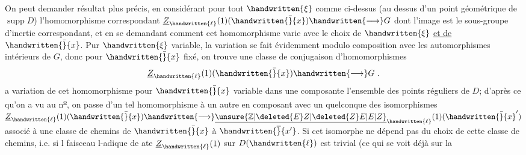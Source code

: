  On peut demander  résultat plus précis, en  considérant pour tout $\handwritten{\xi}$ comme ci-dessus (au dessus d'un point géométrique de $\operatorname{supp}D$) l'homomorphisme correspondant $\underline{Z}_{\handwritten{\ell}}(1)(\handwritten{\bar}{x})\handwritten{\longrightarrow}G$ dont l'image est le sous-groupe d'inertie correspondant, et en se demandant comment cet homomorphisme varie avec le choix de $\handwritten{\xi}$ \uline{et de} $\handwritten{\bar}{x}$. Pur $\handwritten{\xi}$ variable, la variation se fait évidemment modulo composition avec les automorphismes intérieurs de $G$,  donc pour $\handwritten{\bar}{x}$ fixé, on trouve une classe de conjugaison d'homomorphismes
\[
\underline{Z}_{\handwritten{\ell}}(1)(\handwritten{\bar}{x})\handwritten{\longrightarrow}G\ .
\]
 a variation de cet homomorphisme\handwritten{,} pour $\handwritten{\bar}{x}$ variable dans une composante  l'ensemble des points réguliers de $D$; d'après ce qu'on a vu au n\textsuperscript{\uline{o}}, on passe d'un tel homomorphisme à un autre en composant avec un quelconque des isomorphismes $\underline{Z}_{\handwritten{\ell}}(1)(\handwritten{\bar}{x})\handwritten{\longrightarrow}\underline{\unsure{\mathbb{Z}|\deleted{E}Z|\deleted{Z}E|E|Z}}_{\handwritten{\ell}}(1)(\handwritten{\bar}{x}')$ associé à une classe de chemins de $\handwritten{\bar}{x}$ à $\handwritten{\overline}{x'}$. Si cet isomorphe ne dépend pas du choix de cette classe de chemins, i.e. si l faisceau l-adique de ate $\underline{Z}_{\handwritten{\ell}}(1)$ sur $D(\handwritten{\ell})$ est trivial (ce qui se voit déjà sur la

